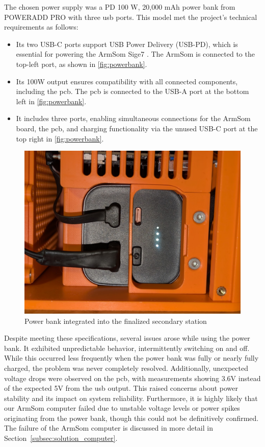 The chosen power supply was a PD 100 W, 20,000 mAh power bank from POWERADD PRO \cite{poweradd_pro_powerbank} with three \acrfull{usb} ports. This model met the project's technical requirements as follows:
\begin{itemize}
	\item Its two USB-C ports support USB Power Delivery (USB-PD), which is essential for powering the ArmSom Sige7 \cite{armsom_sige7}. The ArmSom is connected to the top-left port, as shown in \autoref{fig:powerbank}.
	\item Its 100W output ensures compatibility with all connected components, including the \acrshort{pcb}. The \acrshort{pcb} is connected to the USB-A port at the bottom left in \autoref{fig:powerbank}.
	\item It includes three ports, enabling simultaneous connections for the ArmSom board, the \acrshort{pcb}, and charging functionality via the unused USB-C port at the top right in \autoref{fig:powerbank}.
\end{itemize}

\begin{figure}[H]
	\centering
	\includegraphics[width=1.0\linewidth]{figures/powerbank}
	\caption{Power bank integrated into the finalized secondary station}
	\label{fig:powerbank}
\end{figure}

Despite meeting these specifications, several issues arose while using the power bank. It exhibited unpredictable behavior, intermittently switching on and off. While this occurred less frequently when the power bank was fully or nearly fully charged, the problem was never completely resolved. Additionally, unexpected voltage drops were observed on the \acrshort{pcb}, with measurements showing 3.6V instead of the expected 5V from the \acrshort{usb} output. This raised concerns about power stability and its impact on system reliability. Furthermore, it is highly likely that our ArmSom computer \cite{armsom_sige7} failed due to unstable voltage levels or power spikes originating from the power bank, though this could not be definitively confirmed. The failure of the ArmSom computer is discussed in more detail in Section~\ref{subsec:solution_computer}.

